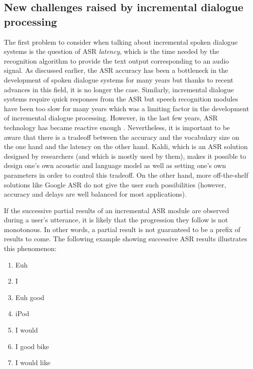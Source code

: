 	\subsection{New challenges raised by incremental dialogue processing}
	\label{soa:challengesincr}
    
		The first problem to consider when talking about incremental spoken dialogue systems is the question of ASR \textit{latency}, which is the time needed by the recognition algorithm to provide the text output corresponding to an audio signal. As discussed earlier, the ASR accuracy has been a bottleneck in the development of spoken dialogue systems for many years but thanks to recent advances in this field, it is no longer the case. Similarly, incremental dialogue systems require quick responses from the ASR but speech recognition modules have been too slow for many years which was a limiting factor in the development of incremental dialogue processing. However, in the last few years, ASR technology has became reactive enough \cite{Breslin2013,Platek2014}. Nevertheless, it is important to be aware that there is a tradeoff between the accuracy and the vocabulary size on the one hand and the latency on the other hand. Kaldi, which is an ASR solution designed by researchers (and which is mostly used by them), makes it possible to design one's own acoustic and language model as well as setting one's own parameters in order to control this tradeoff. On the other hand, more off-the-shelf solutions like Google ASR do not give the user such possibilities (however, accuracy and delays are well balanced for most applications).

		If the successive partial results of an incremental ASR module are observed during a user's utterance, it is likely that the progression they follow is not monotonous. In other words, a partial result is not guaranteed to be a prefix of results to come. The following example showing successive ASR results illustrates this phenomenon:

		\begin{enumerate}
			\item Euh
			\item I
			\item Euh good
			\item iPod
			\item I would
			\item I good bike
			\item I would like
		\end{enumerate}

